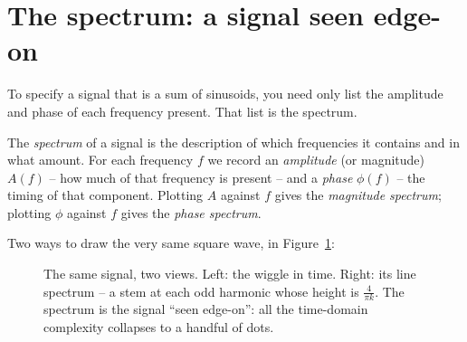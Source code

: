 \section{The spectrum: a signal seen edge-on}

To specify a signal that is a sum of sinusoids, you need only list the amplitude and phase of each frequency present. That list is the spectrum.

\begin{definition}
\label{ch05:spectrum-def}
The \emph{spectrum} of a signal is the description of which frequencies it contains
and in what amount. For each frequency $f$ we record an \emph{amplitude} (or
magnitude) $A(f)$ -- how much of that frequency is present -- and a \emph{phase}
$\phi(f)$ -- the timing of that component. Plotting $A$ against $f$ gives the
\emph{magnitude spectrum}; plotting $\phi$ against $f$ gives the \emph{phase
spectrum}.
\end{definition}

Two ways to draw the very same square wave, in Figure~\ref{ch05:twoviews}:

\begin{figure}[H]
\centering
{}
\caption{The same signal, two views. Left: the wiggle in time. Right: its line
spectrum -- a stem at each odd harmonic whose height is $\frac{4}{\pi k}$. The
spectrum is the signal ``seen edge-on'': all the time-domain complexity collapses to
a handful of dots.}
\label{ch05:twoviews}
\end{figure}

